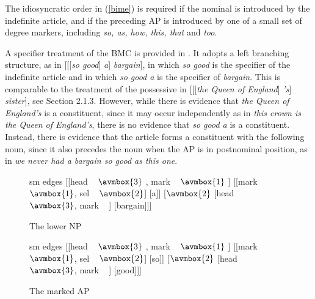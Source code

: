 \documentclass[output=paper]{langsci/langscibook}
\begin{document}
\noindent
The idiosyncratic order in (\ref{bime}) is required if the nominal is introduced 
by the indefinite article, and if the preceding AP is introduced by one of a small 
set of degree markers, including \emph{so, as, how, this, that} and \emph{too}. 

A specifier treatment of the BMC is provided in \citet[201]{GS00}. It adopts  
a left branching structure, as in  [[[\emph{so good}] \emph{a}] \emph{bargain}], 
in which \emph{so good} is the specifier of the indefinite article and in which 
\emph{so good a} is the specifier of \emph{bargain}. This is comparable to the 
treatment of the possessive in [[[\emph{the Queen of England}] \emph{'s}] \emph{sister}],
see Section 2.1.3.  
However, while there is evidence that \emph{the Queen of England's} is a constituent,
since it may occur independently as in \emph{this crown is the Queen of England's}, there is 
no evidence that \emph{so good a} is a constituent. Instead, there is evidence that 
the article forms a constituent with the following noun, since it also precedes the noun 
when the AP is in postnominal position, as in \emph{we never had a bargain so good as this one}.

\begin{figure}
	\centering
	\begin{forest}
sm edges
[{[{\sc head} ~ $\avmbox{3}$ , {\sc mark} ~ $\avmbox{1}$ ]}
		[{[{\sc mark} ~ $\avmbox{1}$, {\sc sel} ~ $\avmbox{2}$]} [a]]
		[{$\avmbox{2}$ [{\sc head} ~ $\avmbox{3}$, {\sc mark} ~ ]} [bargain]]]
	\end{forest}
	\caption{\label{aprob} The lower NP }
\end{figure}

\begin{figure}
	\centering
	\begin{forest}
sm edges
[{[{\sc head} ~ $\avmbox{3}$ , {\sc mark} ~ $\avmbox{1}$ ]}
		[{[{\sc mark} ~ $\avmbox{1}$, {\sc sel} ~ $\avmbox{2}$]} [so]]
		[{$\avmbox{2}$ [{\sc head} ~ $\avmbox{3}$, {\sc mark} ~ ]} [good]]]
	\end{forest}
	\caption{\label{sohow} The marked AP }
\end{figure}
\end{document}
